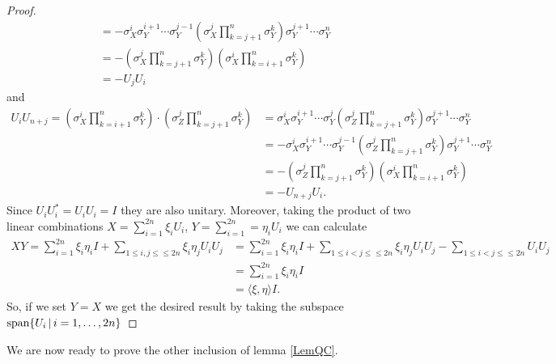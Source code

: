 \begin{proof}
\begin{align*}
		&= - \sigma_X^i \sigma_Y^{i+1} \cdots \sigma_Y^{j-1} ( \sigma_X^j \prod_{k = j+1}^{n}\sigma_Y^k) \sigma_Y^{j+1} \cdots \sigma_Y^n  \\
		&= - ( \sigma_X^j \prod_{k = j+1}^{n}\sigma_Y^k)(\sigma_X^i \prod_{k = i+1}^{n}\sigma_Y^k)  \\
		&= -U_jU_i
		\end{align*}
		and 
		\begin{align*}
		U_iU_{n+j} =  (\sigma_X^i \prod_{k = i+1}^{n}\sigma_Y^k) \cdot( \sigma_Z^j \prod_{k = j+1}^{n}\sigma_Y^k) &=
		\sigma_X^i \sigma_Y^{i+1} \cdots \sigma_Y^j ( \sigma_Z^j \prod_{k = j+1}^{n}\sigma_Y^k) \sigma_Y^{j+1} \cdots \sigma_Y^n \\
		&= - \sigma_X^i \sigma_Y^{i+1} \cdots \sigma_Y^{j-1} ( \sigma_Z^j \prod_{k = j+1}^{n}\sigma_Y^k) \sigma_Y^{j+1} \cdots \sigma_Y^n  \\
		&= - ( \sigma_Z^j \prod_{k = j+1}^{n}\sigma_Y^k)(\sigma_X^i \prod_{k = i+1}^{n}\sigma_Y^k)  \\
		&= -U_{n+j}U_i.
		\end{align*}
		Since $ U_iU_i^* = U_iU_i =  I$ they are also unitary. 
		Moreover, taking the product of two linear combinations $ X = \sum_{i = 1}^{2n}\xi_i U_i$, $ Y = \sum_{i = 1}^{2n} = \eta_iU_i $ we can calculate 
		\begin{align*}
		XY = \sum_{i = 1}^{2n} \xi_i \eta_i I + \sum_{1 \le i,j \le \le 2n}\xi_i\eta_j U_i U_j &= \sum_{i = 1}^{2n} \xi_i \eta_i I + \sum_{1 \le i < j \le \le 2n}\xi_i\eta_jU_iU_j - \sum_{1 \le i < j \le \le 2n}U_iU_j \\
		&=\sum_{i = 1}^{2n} \xi_i \eta_i I \\
		&= \langle \xi, \eta \rangle I.
		\end{align*}
		So, if we set $ Y = X $ we get the desired result by taking the subspace $ \textup{span} \{ U_i \, | \, i = 1,\hdots,2n \} $
		
	\end{proof}

We are now ready to prove the other inclusion of lemma \ref{LemQC}.

